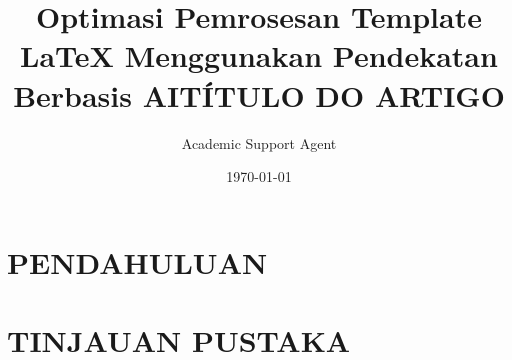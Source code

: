 \documentclass{article}
\title{Optimasi Pemrosesan Template LaTeX Menggunakan Pendekatan Berbasis AI}
\author{Academic Support Agent}
\date{\today}
\begin{document}
\maketitle

\begin{abstract}

\end{abstract}

\chapter{PENDAHULUAN}


\chapter{TINJAUAN PUSTAKA}


\usepackage{sbpo-template}
\usepackage[brazil]{babel}
\usepackage[latin1]{inputenc}
\usepackage{amsmath,amssymb}
\usepackage{url}

\usepackage[square]{natbib}
\usepackage{indentfirst}

\title{T\'ITULO DO ARTIGO} 
\end{document}
